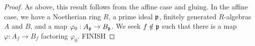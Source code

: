 \begin{proof}
	As above, this result follows from the affine case and gluing. In the affine case, we have a Noetherian ring $R$, a prime ideal $\mathfrak{p}$, finitely generated $R$-algebras $A$ and $B$, and a map $\varphi_0 : A_{\mathfrak{p}} \to B_{\mathfrak{p}}$. We seek $f \notin \mathfrak{p}$ such that there is a map $\varphi : A_f \to B_f$ factoring $\varphi_0$. FINISH
\end{proof}
